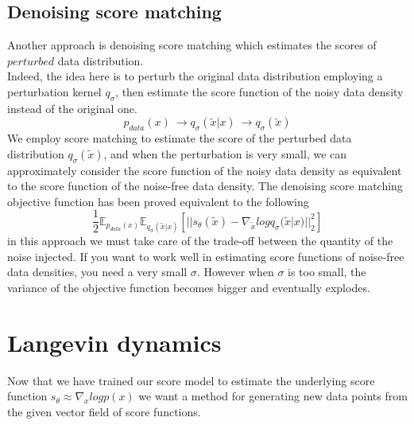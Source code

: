 \documentclass{article}
\begin{document}
	\subsection{Denoising score matching}
	Another approach is denoising score matching which estimates the scores of $perturbed$ data distribution.\\
	Indeed, the idea here is to perturb the original data distribution employing a perturbation kernel $q_{\sigma}$, then estimate the score function of the noisy data density instead of the original one.
	\begin{equation}
	p_{data}(x)\ \longrightarrow q_{\sigma}(\tilde{x}|x)\ \longrightarrow q_{\sigma}(\tilde{x})
	\end{equation}
	We employ score matching to estimate the score of the perturbed data distribution $q_{\sigma}(\tilde{x})$, and when the perturbation is very small, we can approximately consider the score function of the noisy data density as equivalent to the score function of the noise-free data density. The denoising score matching objective function has been proved equivalent to the following
	\begin{equation}
	\frac{1}{2} \mathbb{E}_{p_{data}(x)} \mathbb{E}_{q_{\sigma}(\tilde{x}|x)}[||s_{\theta}(\tilde{x}) - \nabla_{\tilde{x}}logq_{\sigma}(\tilde{x}|x)||_{2}^{2}]
	\end{equation}
	in this approach we must take care of the trade-off between the quantity of the noise injected. If you want to work well in estimating score functions of noise-free data densities, you need a very small $\sigma$. However when $\sigma$ is too small, the variance of the objective function becomes bigger and eventually explodes. 
   \section{Langevin dynamics}
   Now that we have trained our score model to estimate the underlying score function $s_{\theta} \approx \nabla_{x} log p(x)$ we want a method for generating new data points from the given vector field of score functions.
\end{document}
